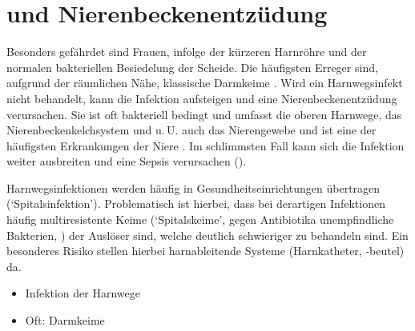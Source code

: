 


\section{ und Nierenbeckenentzüdung }
\label{topic:harnwegsinfekt}%
\label{topic:nierenbeckenentzuendung}%


\TextSlide{\TxBeschreibung}
{%
 Besonders gefährdet sind
Frauen, infolge der kürzeren Harnröhre und der
normalen bakteriellen Besiedelung der Scheide. Die
häufigsten Erreger sind, aufgrund der räumlichen
Nähe, klassische Darmkeime .
Wird ein Harnwegsinfekt nicht behandelt, kann die
Infektion aufsteigen und eine Nierenbeckenentzüdung
verursachen.  
Sie ist oft bakteriell bedingt 
und umfasst die oberen Harnwege, das Nierenbeckenkelchsystem
und u.\,U. auch das Nierengewebe und ist eine der häufigsten
Erkrankungen der Niere \cite{Pschy259}. 
Im schlimmsten Fall kann sich
die Infektion weiter ausbreiten und eine Sepsis
verursachen ().

Harnwegsinfektionen werden häufig in
Gesundheitseinrichtungen übertragen
(\enquote*{Spitalsinfektion}).
Problematisch ist hierbei, dass bei derartigen Infektionen
häufig multiresistente Keime (\enquote*{Spitalskeime},
gegen Antibiotika unempfindliche Bakterien,
) der Auslöser
sind, welche deutlich schwieriger zu behandeln sind. Ein
besonderes Risiko stellen hierbei harnableitende Systeme
(Harnkatheter, -beutel) da.
}
{%
\begin{itemize}
  \item Infektion der Harnwege
  \item Oft: Darmkeime
\end{itemize}
}
{}
{}
{}



